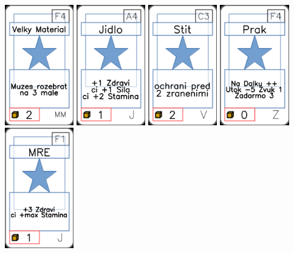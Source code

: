 \documentclass[a4paper]{article}
\begin{document}
	\includegraphics[width=3.0cm]{img-1_58}
	\includegraphics[width=3.0cm]{img-1_3}
	\includegraphics[width=3.0cm]{img-1_72}
	\includegraphics[width=3.0cm]{img-1_88}
	\includegraphics[width=3.0cm]{img-1_25}
\end{document}
